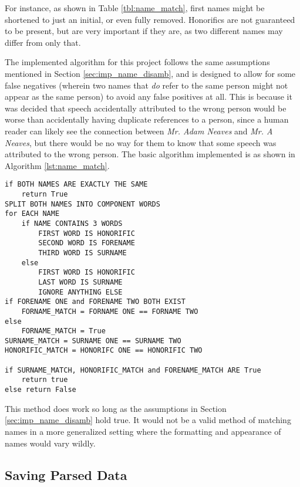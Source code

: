 For instance, as shown in Table \ref{tbl:name_match}, first names might be shortened to just an initial, or even fully removed. Honorifics are not guaranteed to be present, but are very important if they are, as two different names may differ from only that.

The implemented algorithm for this project follows the same assumptions mentioned in Section \ref{sec:imp_name_disamb}, and is designed to allow for some false negatives (wherein two names that \emph{do} refer to the same person might not appear as the same person) to avoid any false positives at all. This is because it was decided that speech accidentally attributed to the wrong person would be worse than accidentally having duplicate references to a person, since a human reader can likely see the connection between \emph{Mr. Adam Neaves} and \emph{Mr. A Neaves}, but there would be no way for them to know that some speech was attributed to the wrong person. The basic algorithm implemented is as shown in Algorithm \ref{lst:name_match}.
\begin{lstlisting}[float=ht,
				   caption={Pseudocode representing the name matching method},
				   label={lst:name_match}]
if BOTH NAMES ARE EXACTLY THE SAME
	return True
SPLIT BOTH NAMES INTO COMPONENT WORDS
for EACH NAME
	if NAME CONTAINS 3 WORDS
		FIRST WORD IS HONORIFIC
		SECOND WORD IS FORENAME
		THIRD WORD IS SURNAME
	else
		FIRST WORD IS HONORIFIC
		LAST WORD IS SURNAME
		IGNORE ANYTHING ELSE
if FORENAME ONE and FORENAME TWO BOTH EXIST
	FORNAME_MATCH = FORNAME ONE == FORNAME TWO
else
	FORNAME_MATCH = True
SURNAME_MATCH = SURNAME ONE == SURNAME TWO
HONORIFIC_MATCH = HONORIFC ONE == HONORIFIC TWO

if SURNAME_MATCH, HONORIFIC_MATCH and FORENAME_MATCH ARE True
	return true
else return False
\end{lstlisting}

This method does work so long as the assumptions in Section \ref{sec:imp_name_disamb} hold true. It would not be a valid method of matching names in a more generalized setting where the formatting and appearance of names would vary wildly.

\subsection{Saving Parsed Data}
\label{sec:imp_saving_pased_data}


